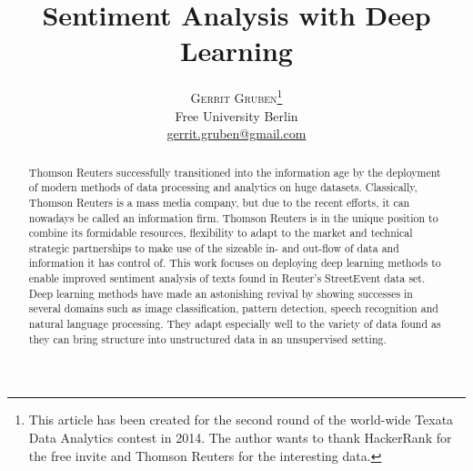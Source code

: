 \documentclass[twoside]{article}
\title{\vspace{-15mm}\fontsize{24pt}{10pt}\selectfont\textbf{Sentiment Analysis with Deep Learning}} %
\author{
\large
\textsc{Gerrit Gruben}\thanks{This article has been created for the second round of the world-wide Texata Data Analytics contest in 2014. The author wants to thank HackerRank for the free invite and Thomson Reuters for the interesting data.}\\[2mm] %
\normalsize Free University Berlin \\ %
\normalsize \href{mailto:gerrit.gruben@gmail.com}{gerrit.gruben@gmail.com} %
\vspace{-5mm}
}
\date{}
\begin{document}
\maketitle %

\thispagestyle{fancy} %


\begin{abstract}

\noindent Thomson Reuters successfully transitioned into the information age by the deployment of modern methods of data processing and analytics on huge datasets. Classically, Thomson Reuters is a mass media company, but due to the recent efforts, it can nowadays be called an information firm. Thomson Reuters is in the unique position to combine its formidable resources, flexibility to adapt to the market and technical strategic partnerships to make use of the sizeable in- and out-flow of data and information it has control of. This work focuses on deploying deep learning methods to enable improved sentiment analysis of texts found in Reuter's StreetEvent data set. Deep learning methods have made an astonishing revival by showing successes in several domains such as image classification, pattern detection, speech recognition and natural language processing. They adapt especially well to the variety of data found as they can bring structure into unstructured data in an unsupervised setting.

\end{abstract}

\end{document}
